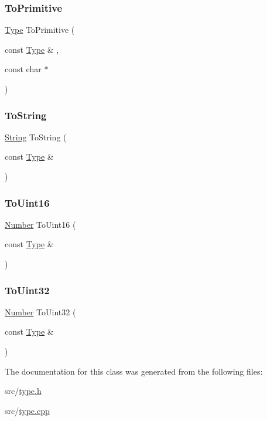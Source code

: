 \subsubsection{\texorpdfstring{To\+Primitive}{ToPrimitive}}
{\footnotesize\ttfamily \hyperlink{class_type}{Type} To\+Primitive (\begin{DoxyParamCaption}\item[{const \hyperlink{class_type}{Type} \&}]{,  }\item[{const char $\ast$}]{ }\end{DoxyParamCaption})\hspace{0.3cm}{\ttfamily [friend]}}

\mbox{\label{class_type_a3a55c50f81af046525d7e158a2625e57}} 
\subsubsection{\texorpdfstring{To\+String}{ToString}}
{\footnotesize\ttfamily \hyperlink{struct_string}{String} To\+String (\begin{DoxyParamCaption}\item[{const \hyperlink{class_type}{Type} \&}]{ }\end{DoxyParamCaption})\hspace{0.3cm}{\ttfamily [friend]}}

\mbox{\label{class_type_acc847f7cb96eb525a1cca35ce6e575aa}} 
\subsubsection{\texorpdfstring{To\+Uint16}{ToUint16}}
{\footnotesize\ttfamily \hyperlink{struct_number}{Number} To\+Uint16 (\begin{DoxyParamCaption}\item[{const \hyperlink{class_type}{Type} \&}]{ }\end{DoxyParamCaption})\hspace{0.3cm}{\ttfamily [friend]}}

\mbox{\label{class_type_adf104091b3326711c9de0cc2c691df0a}} 
\subsubsection{\texorpdfstring{To\+Uint32}{ToUint32}}
{\footnotesize\ttfamily \hyperlink{struct_number}{Number} To\+Uint32 (\begin{DoxyParamCaption}\item[{const \hyperlink{class_type}{Type} \&}]{ }\end{DoxyParamCaption})\hspace{0.3cm}{\ttfamily [friend]}}



The documentation for this class was generated from the following files\+:\begin{DoxyCompactItemize}
\item 
src/\hyperlink{type_8h}{type.\+h}\item 
src/\hyperlink{type_8cpp}{type.\+cpp}\end{DoxyCompactItemize}
